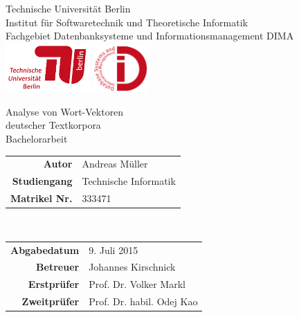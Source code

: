 
\pagestyle{empty}

\clearscrheadings\clearscrplain
\begin{center}
{\huge Technische Universität Berlin}\\
\vspace{3mm}
{\Large Institut für Softwaretechnik und Theoretische Informatik}\\
{\large Fachgebiet Datenbanksysteme und Informationsmanagement DIMA}\\

\vspace{15mm}
\includegraphics[width=0.24\textwidth]{images/logo_tu_berlin}
\hspace{10mm}
\includegraphics[width=0.16\textwidth]{images/logo_dima}
\vspace{15mm}

{\Huge Analyse von Wort-Vektoren\\deutscher Textkorpora}\\
\vspace{8mm}
{\large Bachelorarbeit}\\
\vspace{0.4cm}
\vspace{2 cm}
\begin{tabular}{rl}
{\bfseries Autor} & Andreas Müller\\
{\bfseries Studiengang} & Technische Informatik\\
{\bfseries Matrikel Nr.} & 333471\\
\end{tabular}\\
\vspace{2.5cm}
\begin{tabular}{rl}
\vspace{0.5cm}
{\bfseries Abgabedatum} & 9. Juli 2015\\
{\bfseries Betreuer} & Johannes Kirschnick\\
{\bfseries Erstprüfer} & Prof. Dr. Volker Markl\\
{\bfseries Zweitprüfer} & Prof. Dr. habil. Odej Kao\\
\end{tabular}

\end{center}
\clearpage

